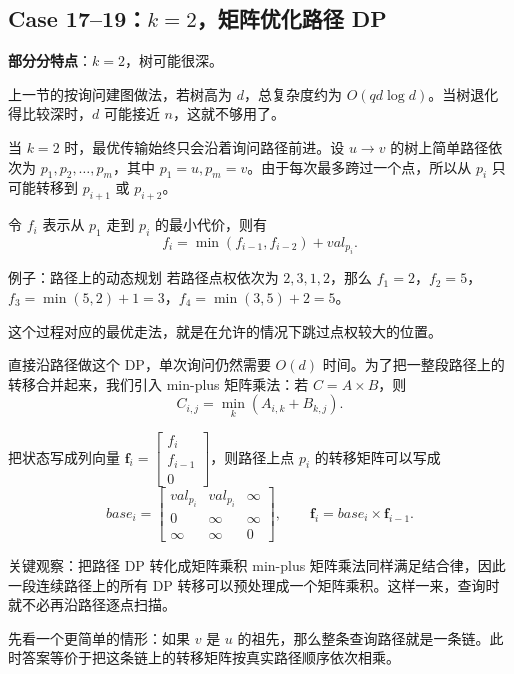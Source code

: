 \documentclass{book}
\begin{document}
\newpage
\subsection{Case 17--19：\texorpdfstring{$k=2$}{k=2}，矩阵优化路径 DP}
    \textbf{部分分特点}：$k=2$，树可能很深。

    上一节的按询问建图做法，若树高为 $d$，总复杂度约为 $O(qd\log d)$。当树退化得比较深时，$d$ 可能接近 $n$，这就不够用了。

    当 $k=2$ 时，最优传输始终只会沿着询问路径前进。设 $u\rightarrow v$ 的树上简单路径依次为 $p_1,p_2,\dots,p_m$，其中 $p_1=u,p_m=v$。由于每次最多跨过一个点，所以从 $p_i$ 只可能转移到 $p_{i+1}$ 或 $p_{i+2}$。

    令 $f_i$ 表示从 $p_1$ 走到 $p_i$ 的最小代价，则有
    \[
    f_i=\min(f_{i-1},f_{i-2})+val_{p_i}.
    \]

\begin{examplebox}{例子：路径上的动态规划}
若路径点权依次为 $2,3,1,2$，那么 $f_1=2$，$f_2=5$，$f_3=\min(5,2)+1=3$，$f_4=\min(3,5)+2=5$。

这个过程对应的最优走法，就是在允许的情况下跳过点权较大的位置。
\end{examplebox}

    直接沿路径做这个 DP，单次询问仍然需要 $O(d)$ 时间。为了把一整段路径上的转移合并起来，我们引入 min-plus 矩阵乘法：若 $C=A\times B$，则
    \[
    C_{i,j}=\min_k(A_{i,k}+B_{k,j}).
    \]

    把状态写成列向量 $\bm{f}_i=\begin{bmatrix}f_i\\ f_{i-1}\\ 0\end{bmatrix}$，则路径上点 $p_i$ 的转移矩阵可以写成
    \[
    base_i=
    \begin{bmatrix}
    val_{p_i} & val_{p_i} & \infty \\
    0 & \infty & \infty \\
    \infty & \infty & 0
    \end{bmatrix},
    \qquad
    \bm{f}_i=base_i\times \bm{f}_{i-1}.
    \]

\begin{keybox}{关键观察：把路径 DP 转化成矩阵乘积}
min-plus 矩阵乘法同样满足结合律，因此一段连续路径上的所有 DP 转移可以预处理成一个矩阵乘积。这样一来，查询时就不必再沿路径逐点扫描。
\end{keybox}

    先看一个更简单的情形：如果 $v$ 是 $u$ 的祖先，那么整条查询路径就是一条链。此时答案等价于把这条链上的转移矩阵按真实路径顺序依次相乘。
\end{document}

